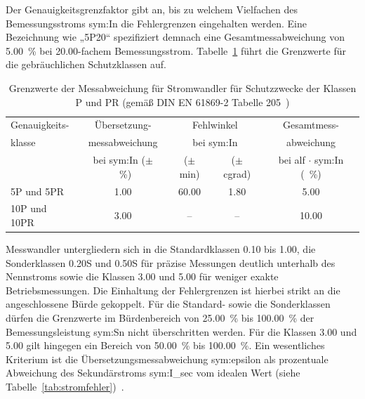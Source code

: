 Der Genauigkeitsgrenzfaktor gibt an, bis zu welchem Vielfachen des Bemessungsstroms \gls{sym:In} die Fehlergrenzen eingehalten werden. Eine Bezeichnung wie „5P20“ spezifiziert demnach eine Gesamtmessabweichung von \SI{5,00}{\percent} bei \num{20,00}-fachem Bemessungsstrom. Tabelle~\ref{tab:schutzwandler_fehler} führt die Grenzwerte für die gebräuchlichen Schutzklassen auf.

\begin{table}[H]
    \centering
    \caption[Grenzwerte für Schutzwandler der Klassen P und PR]{Grenzwerte der Messabweichung für Stromwandler für Schutzzwecke der Klassen P und PR (gemäß DIN EN 61869-2 Tabelle 205~\cite[S.~24]{norm-DIN_EN_61869_2-Messwandler_Teil2-DIN})}
    \label{tab:schutzwandler_fehler}
    \begin{tabular}{lcccc}
        \toprule
        Genauigkeits- & Übersetzung-                             & \multicolumn{2}{c}{Fehlwinkel}       & Gesamtmess-                                                          \\
        klasse        & messabweichung                           & \multicolumn{2}{c}{bei \gls{sym:In}} & abweichung                                                           \\
                      & bei \gls{sym:In} ($\pm$ \SI{}{\percent}) & ($\pm$ min)                          & ($\pm$ cgrad) & bei \gls{alf} $\cdot$ \gls{sym:In} (\SI{}{\percent}) \\
        \midrule
        5P und 5PR    & \num{1,00}                               & \num{60,00}                          & \num{1,80}    & \num{5,00}                                           \\
        10P und 10PR  & \num{3,00}                               & --                                   & --            & \num{10,00}                                          \\
        \bottomrule
    \end{tabular}
\end{table}

Messwandler untergliedern sich in die Standardklassen \num{0,10} bis \num{1,00}, die Sonderklassen \num{0,20}S und \num{0,50}S für präzise Messungen deutlich unterhalb des Nennstroms sowie die Klassen \num{3,00} und \num{5,00} für weniger exakte Betriebsmessungen. Die Einhaltung der Fehlergrenzen ist hierbei strikt an die angeschlossene Bürde gekoppelt. Für die Standard- sowie die Sonderklassen dürfen die Grenzwerte im Bürdenbereich von \SI{25,00}{\percent} bis \SI{100,00}{\percent} der Bemessungsleistung \gls{sym:Sn} nicht überschritten werden. Für die Klassen \num{3,00} und \num{5,00} gilt hingegen ein Bereich von \SI{50,00}{\percent} bis \SI{100,00}{\percent}. Ein wesentliches Kriterium ist die Übersetzungsmessabweichung \gls{sym:epsilon} als prozentuale Abweichung des Sekundärstroms \gls{sym:I_sec} vom idealen Wert (siehe Tabelle~\ref{tab:stromfehler})~\cite[S.~21]{norm-DIN_EN_61869_2-Messwandler_Teil2-DIN}.

